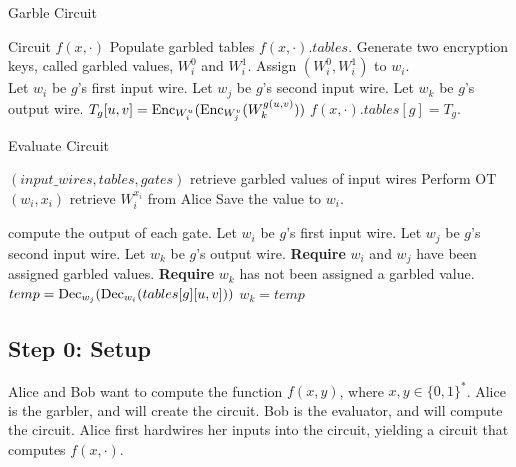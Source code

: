 \begin{algorithm}
\caption{Garble Circuit}
\label{alg:garble}
\begin{algorithmic}
    \Require Circuit $f(x,\cdot)$ 
    \Ensure Populate garbled tables $f(x,\cdot).tables$.
    \State Generate two encryption keys, called garbled values, $W_i^0$ and $W_i^1$.
    \State Assign $(W_i^0, W_i^1)$ to $w_i$.
\EndFor \\

    \State Let $w_i$ be $g$'s first input wire.
    \State Let $w_j$ be $g$'s second input wire.
    \State Let $w_k$ be $g$'s output wire.
    \State $T_g[u,v] = \operatorname{Enc}_{W_i^u}( \operatorname{Enc}_{W_j^v} ( W_k^{g(u,v)}))$
    \EndFor
    \State $f(x,\cdot).tables[g] = T_g$.
\EndFor
\end{algorithmic}
\end{algorithm}

\begin{algorithm}
\caption{Evaluate Circuit}
\label{alg:evaluate}
\begin{algorithmic}

\Require $(input\_wires, tables, gates)$
	\Comment retrieve garbled values of input wires
	\State Perform OT$(w_i, x_i)$ 
	\Comment retrieve $W^{x_i}_i$ from Alice
	\State Save the value to $w_i$.
\EndFor

	\Comment compute the output of each gate.
	\State Let $w_i$ be $g$'s first input wire.
	\State Let $w_j$ be $g$'s second input wire.
	\State Let $w_k$ be $g$'s output wire.
	\State \textbf{Require} $w_i$ and $w_j$ have been assigned garbled values.
	\State \textbf{Require} $w_k$ has not been assigned a garbled value.
		\State $temp = \operatorname{Dec}_{w_j}(\operatorname{Dec}_{w_i}(tables[g][u,v]))$
			\State $w_k = temp$
		\EndIf
	\EndFor
\EndFor
\end{algorithmic}
\end{algorithm}

\subsection{Step 0: Setup}
Alice and Bob want to compute the function $f(x,y)$, where $x,y \in \{0,1\}^*$.
Alice is the garbler, and will create the circuit.
Bob is the evaluator, and will compute the circuit.
Alice first hardwires her inputs into the circuit, yielding a circuit that computes $f(x,\cdot)$.

